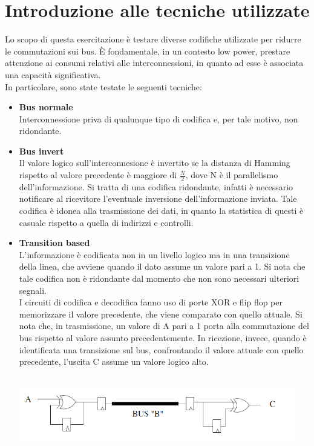\documentclass[11pt,  english, makeidx, a4paper, titlepage, oneside]{book}
\begin{document}
\section{Introduzione alle tecniche utilizzate}
Lo scopo di questa esercitazione è testare diverse codifiche utilizzate per ridurre le commutazioni sui bus. È fondamentale, in un contesto low power, prestare attenzione ai consumi relativi alle interconnessioni, in quanto ad esse è associata una capacità significativa.
\\
In particolare, sono state testate le seguenti tecniche:
\begin{itemize}
\item \textbf{Bus normale}
\\
Interconnessione priva di qualunque tipo di codifica e, per tale motivo, non ridondante.
\item \textbf{Bus invert}
\\
Il valore logico sull'interconnesione è invertito se la distanza di Hamming rispetto al valore precedente è maggiore di $\frac{N}{2}$, dove N è il parallelismo dell'informazione. Si tratta di una codifica ridondante, infatti è necessario notificare al ricevitore l'eventuale inversione dell'informazione inviata.
Tale codifica è idonea alla trasmissione dei dati, in quanto la statistica di questi è casuale rispetto a quella di indirizzi e controlli.
\item \textbf{Transition based}
\\
L'informazione è codificata non in un livello logico ma in una transizione della linea, che avviene quando il dato assume un valore pari a 1. Si nota che tale codifica non è ridondante dal momento che non sono necessari ulteriori segnali.
\\
I circuiti di codifica e decodifica fanno uso di porte XOR e flip flop per memorizzare il valore precedente, che viene comparato con quello attuale. Si nota che, in trasmissione, un valore di A pari a 1 porta alla commutazione del bus rispetto al valore assunto precedentemente. In ricezione, invece, quando è identificata una transizione sul bus, confrontando il valore attuale con quello precedente, l'uscita C assume un valore logico alto.
\\\\
\centerline{\includegraphics[width=12cm]{./img/Lab_4/tran_based.png}}

\end{itemize}
\end{document}
